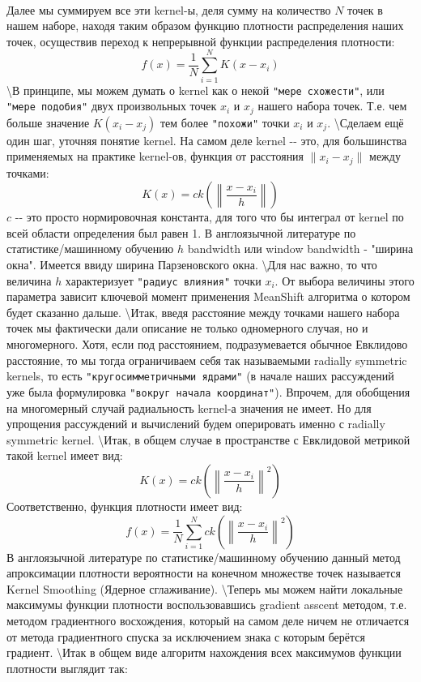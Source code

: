 \documentclass[11pt]{article}
\begin{document}
    \begin{center}
    \end{center}
    { \hspace*{\fill} \\}
    
    Далее мы суммируем все эти kernel-ы, деля сумму на количество $N$ точек
в нашем наборе, находя таким образом функцию плотности распределения
наших точек, осуществив переход к непрерывной функции распределения
плотности: \[ f(x) = \frac{1}{N}\sum\limits_{i = 1}^{N}K(x - x_i) \]
\textbackslash{}В принципе, мы можем думать о kernel как о некой
\verb'"мере схожести"', или \verb'"мере подобия"' двух произвольных
точек $x_i$ и $x_j$ нашего набора точек. Т.е. чем больше значение
$K(x_i - x_j)$ тем более \verb'"похожи"' точки $x_i$ и $x_j$.
\textbackslash{}Сделаем ещё один шаг, уточняя понятие kernel. На самом
деле kernel -\/- это, для большинства применяемых на практике kernel-ов,
функция от расстояния $\|x_i - x_j\|$ между точками:
\[ K(x) = ck\left(\left\|\frac{x - x_i}{h}\right\|\right)\] $c$ -\/- это
просто нормировочная константа, для того что бы интеграл от kernel по
всей области определения был равен 1. В англоязычной литературе по
статистике/машинному обучению $h$ bandwidth или window bandwidth -
"ширина окна". Имеется ввиду ширина Парзеновского окна.
\textbackslash{}Для нас важно, то что величина $h$ характеризует
\verb'"радиус влияния"' точки $x_i$. От выбора величины этого параметра
зависит ключевой момент применения MeanShift алгоритма о котором будет
сказанно дальше. \textbackslash{}Итак, введя расстояние между точками
нашего набора точек мы фактически дали описание не только одномерного
случая, но и многомерного. Хотя, если под расстоянием, подразумевается
обычное Евклидово расстояние, то мы тогда ограничиваем себя так
называемыми radially symmetric kernels, то есть
\verb'"кругосимметричными ядрами"' (в начале наших рассуждений уже была
формулировка \verb'"вокруг начала координат"'). Впрочем, для обобщения
на многомерный случай радиальность kernel-а значения не имеет. Но для
упрощения рассуждений и вычислений будем оперировать именно с radially
symmetric kernel. \textbackslash{}Итак, в общем случае в пространстве с
Евклидовой метрикой такой kernel имеет вид: \[
K(x) = ck\left(\left\|\frac{x - x_i}{h}\right\|^2\right)
\] Соответственно, функция плотности имеет вид: \[
f(x) = \frac{1}{N}\sum\limits_{i = 1}^{N}ck\left(\left\|\frac{x - x_i}{h}\right\|^2\right)
\] В англоязычной литературе по статистике/машинному обучению данный
метод апроксимации плотности вероятности на конечном множестве точек
называется Kernel Smoothing (Ядерное сглаживание).
\textbackslash{}Теперь мы можем найти локальные максимумы функции
плотности воспользовавшись gradient asscent методом, т.е. методом
градиентного восхождения, который на самом деле ничем не отличается от
метода градиентного спуска за исключением знака с которым берётся
градиент. \textbackslash{}Итак в общем виде алгоритм нахождения всех
максимумов функции плотности выглядит так:
\end{document}
